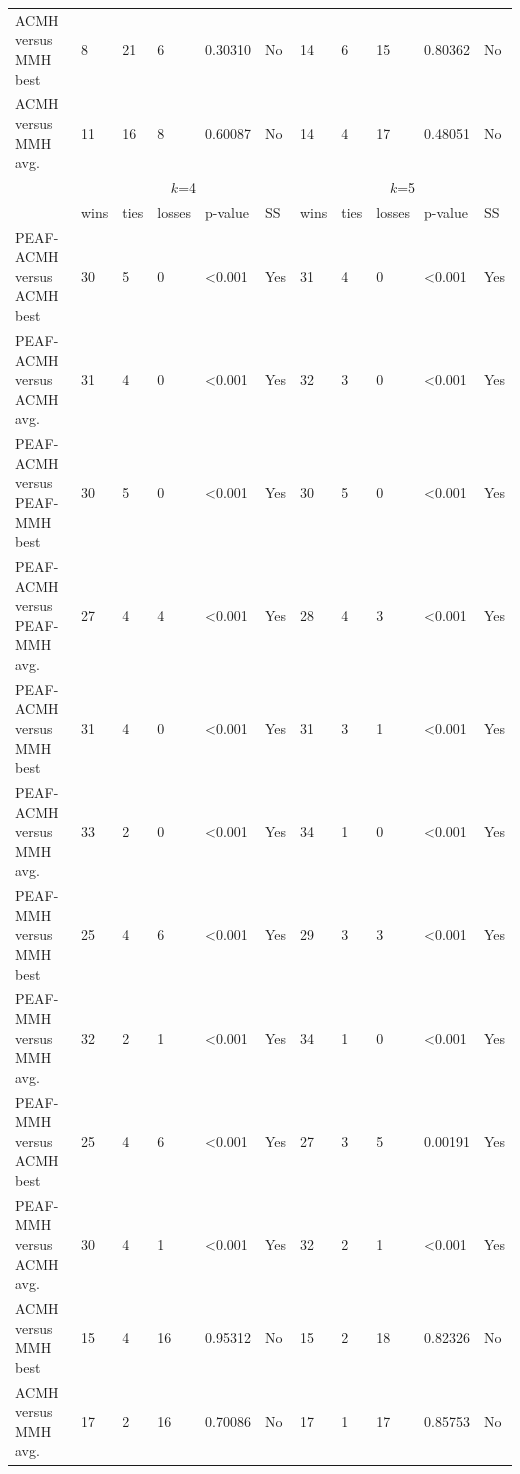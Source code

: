 \documentclass[12pt, a4paper]{article}%
\numberwithin{equation}{section}
\theoremstyle{plain}
\begin{document}
{\begin{landscape}
\begin{longtable}{|l|lllll|lllll|}
						ACMH versus MMH best                   & 8    & 21   & 6      & 0.30310          & No  & 14   & 6    & 15     & 0.80362          & No  \\
						ACMH versus MMH avg.                   & 11   & 16   & 8      & 0.60087          & No  & 14   & 4    & 17     & 0.48051          & No  \\ \hline
						\multicolumn{1}{|c|}{\multirow{2}{*}{}} & \multicolumn{5}{c|}{$k$=4}                    & \multicolumn{5}{c|}{$k$=5}                    \\ \cline{2-11} 
						\multicolumn{1}{|c|}{}                  & wins & ties & losses & p-value          & SS  & wins & ties & losses & p-value          & SS  \\ \hline
						PEAF-ACMH versus ACMH best             & 30   & 5    & 0      & \textless{}0.001 & Yes & 31   & 4    & 0      & \textless{}0.001 & Yes \\
						PEAF-ACMH versus ACMH avg.             & 31   & 4    & 0      & \textless{}0.001 & Yes & 32   & 3    & 0      & \textless{}0.001 & Yes \\
						PEAF-ACMH versus PEAF-MMH best           & 30   & 5    & 0      & \textless{}0.001 & Yes & 30   & 5    & 0      & \textless{}0.001 & Yes \\
						PEAF-ACMH versus PEAF-MMH avg.           & 27   & 4    & 4      & \textless{}0.001 & Yes & 28   & 4    & 3      & \textless{}0.001 & Yes \\
						PEAF-ACMH versus MMH best               & 31   & 4    & 0      & \textless{}0.001 & Yes & 31   & 3    & 1      & \textless{}0.001 & Yes \\
						PEAF-ACMH versus MMH avg.               & 33   & 2    & 0      & \textless{}0.001 & Yes & 34   & 1    & 0      & \textless{}0.001 & Yes \\
						PEAF-MMH versus MMH best                 & 25   & 4    & 6      & \textless{}0.001 & Yes & 29   & 3    & 3      & \textless{}0.001 & Yes \\
						PEAF-MMH versus MMH avg.                 & 32   & 2    & 1      & \textless{}0.001 & Yes & 34   & 1    & 0      & \textless{}0.001 & Yes \\
						PEAF-MMH versus ACMH best               & 25   & 4    & 6      & \textless{}0.001 & Yes & 27   & 3    & 5      & 0.00191          & Yes \\
						PEAF-MMH versus ACMH avg.               & 30   & 4    & 1      & \textless{}0.001 & Yes & 32   & 2    & 1      & \textless{}0.001 & Yes \\
						ACMH versus MMH best                   & 15   & 4    & 16     & 0.95312          & No  & 15   & 2    & 18     & 0.82326          & No  \\
						ACMH versus MMH avg.                   & 17   & 2    & 16     & 0.70086          & No  & 17   & 1    & 17     & 0.85753          & No  \\ \hline
					\end{longtable}
				\end{landscape}
			}
			
\end{document}
